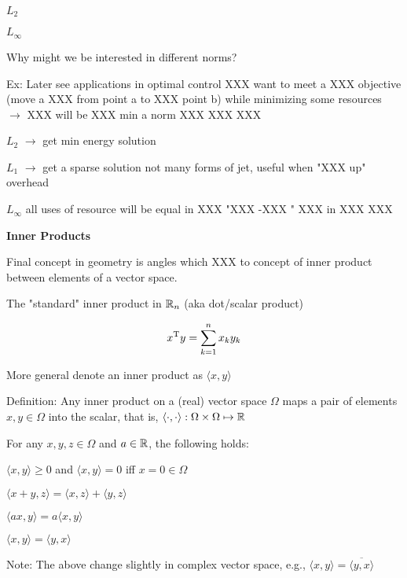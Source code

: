 $L_{2}$

\begin{marginfigure}
	\centering
	\resizebox{7.5cm}{3cm}{}
	\caption{}
	\label{}
\end{marginfigure}

$L_{\infty}$

\begin{marginfigure}
	\centering
	\resizebox{7.5cm}{3cm}{}
	\caption{}
	\label{}
\end{marginfigure}


Why might we be interested in different norms?


Ex: Later see applications in optimal control XXX want to meet a XXX objective (move a XXX from point a to XXX point b) while minimizing some resources $\rightarrow$ XXX will be XXX min a norm XXX XXX XXX 


$L_2$ $\rightarrow$ get min energy solution

$L_1$ $\rightarrow$ get a sparse solution not many forms of jet, useful when "XXX up" overhead

$L_\infty$ all uses of resource will be equal in XXX "XXX -XXX " XXX in XXX XXX

\vspace{0.5cm}
\noindent\textbf{Inner Products}

Final concept in geometry is angles which XXX to concept of inner product between elements of a vector space.

The "standard" inner product in $\mathbb{R}_{n}$ (aka dot/scalar product)

$$x^{{\rm T}}y=\sum_{k=1}^{n}x_{k}y_{k}$$

More general denote an inner product as $\langle x,y\rangle$

Definition: Any inner product on a (real) vector space $\Omega$ maps a pair of elements $x, y\in\Omega$ into the scalar, that is, $\langle \cdot,\cdot\rangle:\Omega\times\Omega\mapsto\mathbb{R}$

For any $x, y, z\in\Omega$ and $a\in\mathbb{R}$, the following holds:

$\langle x,y\rangle\geq 0$ and $\langle x,y\rangle=0$ iff $x=0\in\Omega$

$\langle x+y,z\rangle=\langle x,z\rangle+\langle y,z\rangle$

$\langle ax,y\rangle=a\langle x,y\rangle$

$\langle x,y\rangle=\langle y,x\rangle$


Note:
The above change slightly in complex vector space, e.g., $\langle x,y\rangle=\overline{\langle y,x\rangle}$

